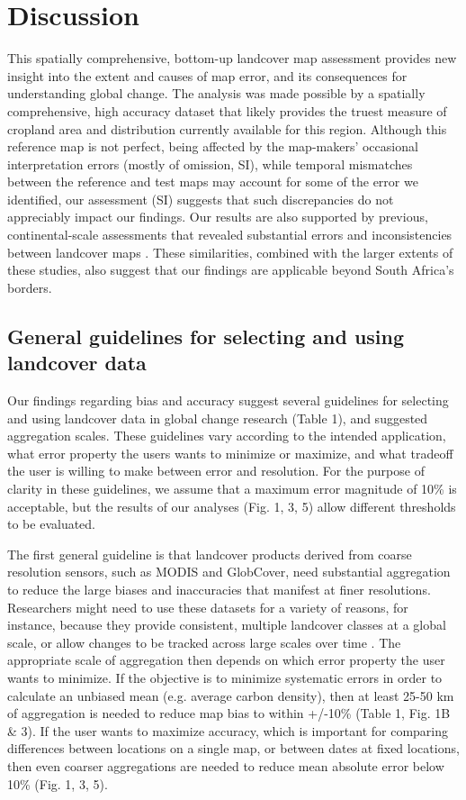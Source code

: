 \documentclass[a4paper]{article}
\begin{document}
\section*{Discussion}
This spatially comprehensive, bottom-up landcover map assessment provides new insight into the extent and causes of map error, and its consequences for understanding global change. The analysis was made possible by a spatially comprehensive, high accuracy dataset that likely provides the truest measure of cropland area and distribution currently available for this region. Although this reference map is not perfect, being affected by the map-makers' occasional interpretation errors (mostly of omission, SI), while temporal mismatches between the reference and test maps may account for some of the error we identified, our assessment (SI) suggests that such discrepancies do not appreciably impact our findings. Our results are also supported by previous, continental-scale assessments that revealed substantial errors and inconsistencies between landcover maps \citep{fritz_comparison_2010,gross_monitoring_2013}. These similarities, combined with the larger extents of these studies, also suggest that our findings are applicable beyond South Africa's borders.

\subsection*{General guidelines for selecting and using landcover data}
Our findings regarding bias and accuracy suggest several guidelines for selecting and using landcover data in global change research (Table 1), and suggested aggregation scales. These guidelines vary according to the intended application, what error property the users wants to minimize or maximize, and what tradeoff the user is willing to make between error and resolution.  For the purpose of clarity in these guidelines, we assume that a maximum error magnitude of 10\% is acceptable, but the results of our analyses (Fig. 1, 3, 5) allow different thresholds to be  evaluated.  

The first general guideline is that landcover products derived from coarse resolution sensors, such as MODIS and GlobCover, need substantial aggregation to reduce the large biases and inaccuracies that manifest at finer resolutions. Researchers might need to use these datasets for a variety of reasons, for instance, because they provide consistent, multiple landcover classes at a global scale, or allow changes to be tracked across large scales over time \citep{luoto_predicting_2004}. The appropriate scale of aggregation then depends on which error property the user wants to minimize. If the objective is to minimize systematic errors in order to calculate an unbiased mean (e.g. average carbon density), then at least 25-50 km of aggregation is needed to reduce map bias to within +/-10\% (Table 1, Fig. 1B \& 3). If the user wants to maximize accuracy, which is important for comparing differences between locations on a single map, or between dates at fixed locations, then even coarser aggregations are needed to reduce mean absolute error below 10\% (Fig. 1, 3, 5).  
\end{document}
